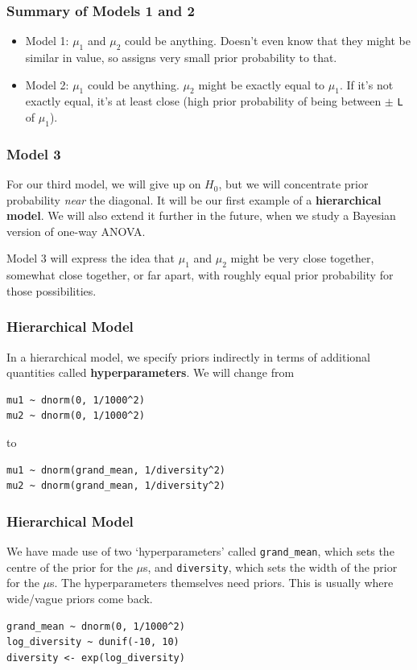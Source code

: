 \documentclass{beamer}
\begin{document}
\begin{frame}[fragile]
\frametitle{Summary of Models 1 and 2}
\begin{itemize}
\item Model 1: $\mu_1$ and $\mu_2$ could be anything. Doesn't even know that
they might be similar in value, so assigns very small prior probability to that.\pause
\item Model 2: $\mu_1$ could be anything. $\mu_2$ might be exactly equal to
$\mu_1$. If it's not exactly equal, it's at least close (high prior probability
of being between $\pm$ \texttt{L} of $\mu_1$). 
\end{itemize}


\end{frame}


\begin{frame}
\frametitle{Model 3}
For our third model, we will give up on $H_0$, but we will concentrate
prior probability {\em near} the diagonal. It will be our first example of
a {\bf hierarchical model}. We will also extend it further in the future,
when we study a Bayesian version of one-way ANOVA.\\[0.5em]\pause

Model 3 will express the idea that $\mu_1$ and $\mu_2$ might be very close
together, somewhat close together, or far apart, with roughly equal prior
probability for those possibilities.
\end{frame}


\begin{frame}[fragile]
\frametitle{Hierarchical Model}
In a hierarchical model, we specify priors indirectly in terms of additional
quantities called {\bf hyperparameters}. We will change from
\begin{verbatim}
mu1 ~ dnorm(0, 1/1000^2)
mu2 ~ dnorm(0, 1/1000^2)
\end{verbatim}
\pause
to
\begin{verbatim}
mu1 ~ dnorm(grand_mean, 1/diversity^2)
mu2 ~ dnorm(grand_mean, 1/diversity^2)
\end{verbatim}

\end{frame}

\begin{frame}[fragile]
\frametitle{Hierarchical Model}
We have made use of two `hyperparameters' called \texttt{grand_mean},
which sets the centre of the prior for the $\mu$s, and \texttt{diversity},
which sets the width of the prior for the $\mu$s. The hyperparameters
themselves need priors. This is usually where wide/vague priors come back.\\[0.5em]

\begin{verbatim}
grand_mean ~ dnorm(0, 1/1000^2)
log_diversity ~ dunif(-10, 10)
diversity <- exp(log_diversity)
\end{verbatim}

\end{frame}
\end{document}
